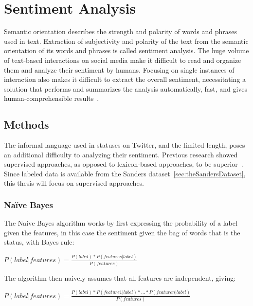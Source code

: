 \chapter{Sentiment Analysis}
\label{ch:sentimentAnalysis}

Semantic orientation describes the strength and polarity of words and phrases used in text.
Extraction of subjectivity and polarity of the text from the semantic orientation of its words and phrases is called sentiment analysis.
The huge volume of text-based interactions on social media make it difficult
to read and organize them and analyze their sentiment by humans.
Focusing on single instances of interaction also makes it difficult to extract the overall sentiment,
necessitating a solution that performs and summarizes the analysis automatically, fast, and gives human-comprehensible results~\cite{Sarlan2014}.

\section{Methods}
\label{sec:methods}

The informal language used in statuses on Twitter, and the limited length, poses an additional difficulty
to analyzing their sentiment.
Previous research showed supervised approaches, as opposed to lexicon-based approaches, to be superior~\cite{Sarlan2014}.
Since labeled data is available from the Sanders dataset~\ref{sec:theSandersDataset},
this thesis will focus on supervised approaches.

\subsection{Na\"{i}ve Bayes}
\label{subsec:naivebayes}

The Naive Bayes algorithm works by first expressing the probability of a label given the features,
in this case the sentiment given the bag of words that is the status, with Bayes rule:

\begin{math}
    P(label|features) = \frac{P(label)*P(features|label)}{P(features)}
\end{math}

The algorithm then naively assumes that all features are independent, giving:

\begin{math}
    P(label|features) = \frac{P(label)*P(feature 1|label)*...*P(feature n|label)}{P(features)}
\end{math}


